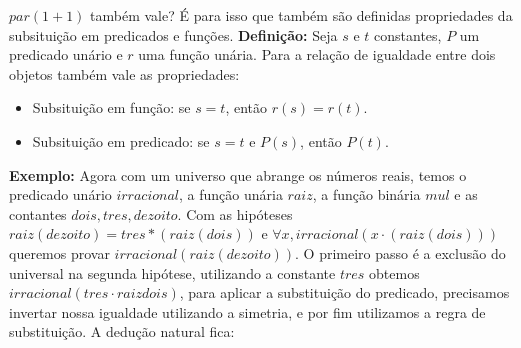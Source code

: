        $par(1+1)$ também vale? É para isso que também são definidas propriedades da subsituição em predicados e funções.
        \newline \textbf{Definição:} Seja $s$ e $t$ constantes, $P$ um predicado unário e $r$ uma função unária.
        Para a relação de igualdade entre dois objetos também vale as propriedades:
        \begin{itemize}
            \item Subsituição em função: se $s=t$, então $r(s) = r(t)$. 
            \item Subsituição em predicado: se $s=t$ e $P(s)$, então $P(t)$.
        \end{itemize}
        \begin{center}
            \begin{bprooftree}
            \end{bprooftree}
            \begin{bprooftree}
            \end{bprooftree}
        \end{center}
        \textbf{Exemplo:} Agora com um universo que abrange os números reais, temos o predicado unário $irracional$,
        a função unária $raiz$, a função binária $mul$ e as contantes $dois, tres, dezoito$. Com as hipóteses 
        $raiz (dezoito) = tres*(raiz(dois))$ e $\forall x, irracional(x \cdot (raiz (dois)))$ queremos provar $irracional(raiz (dezoito))$. O primeiro
        passo é a exclusão do universal na segunda hipótese, utilizando a constante $tres$ obtemos $irracional (tres \cdot raiz dois)$,
        para aplicar a substituição do predicado, precisamos invertar nossa igualdade utilizando a simetria, e por 
        fim utilizamos a regra de substituição. A dedução natural fica:
        \begin{center}
            \begin{bprooftree}
            \end{bprooftree}
        \end{center}
